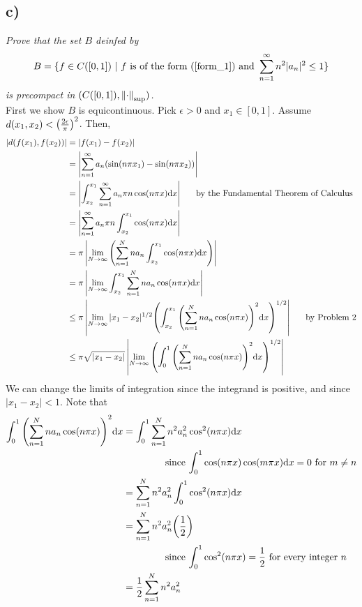 \documentclass[12pt]{article}
\begin{document}
\subsection*{ c)}
\emph{Prove that the set $B$ deinfed by}
\begin{equation*}
	B = \{f \in C([0,1])\ |\ f \text{ is of the form (\ref{form_1}) and } \sum_{n=1}^\infty n^2|a_n|^2 \leq 1\}
\end{equation*}
\emph{is precompact in $(C([0,1]), \norm{\cdot}_{\text{sup}})$.}\\

First we show $B$ is equicontinuous.  Pick $\epsilon >0$ and $x_1 \in [0,1]$.  Assume $d(x_1, x_2) < \qty(\frac{2\epsilon}{\pi})^2$.  Then,
\begin{align*}
	|d(f(x_1), f(x_2))| &= |f(x_1) - f(x_2)| \\
	&= \left|\sum_{n=1}^\infty a_n\qty(\sin(n\pi x_1) - \sin(n\pi x_2))\right| \\
	&= \left|\int_{x_2}^{x_1}\sum_{n=1}^\infty a_n \pi n \cos(n\pi x) \dd x\right| \ \ \ \ \ \text{by the Fundamental Theorem of Calculus} \\
	&= \left|\sum_{n=1}^\infty a_n\pi n \int_{x_2}^{x_1} \cos(n\pi x) \dd x\right| \\
	&= \pi \left|\lim_{N\rightarrow\infty}\qty(\sum_{n=1}^N n a_n \int_{x_2}^{x_1} \cos(n\pi x)\dd x)\right| \\
	&= \pi \left|\lim_{N\rightarrow\infty} \int_{x_2}^{x_1}\sum_{n=1}^N n a_n \cos(n\pi x) \dd x\right| \\
	&\leq \pi\left|\lim_{N\rightarrow\infty} |x_1 - x_2|^{1/2}\qty(\int_{x_2}^{x_1} \qty(\sum_{n=1}^N n a_n \cos(n\pi x))^2 \dd x)^{1/2}\right| \ \ \ \ \ \text{by Problem 2} \\
	&\leq \pi\sqrt{|x_1 - x_2|}\left|\lim_{N\rightarrow\infty} \qty(\int_0^1 \qty(\sum_{n=1}^N n a_n \cos(n\pi x))^2 \dd x)^{1/2}\right|
\end{align*}
We can change the limits of integration since the integrand is positive, and since $|x_1 - x_2| < 1$.  Note that
\begin{align*}
	\int_0^1\qty(\sum_{n=1}^N n a_n \cos(n\pi x))^2 \dd x &= \int_0^1\sum_{n=1}^N n^2 a_n^2 \cos^2(n\pi x) \dd x \\
	&\hphantom{mmmmm}\text{since $\displaystyle\int_0^1 \cos(n\pi x)\cos(m \pi x) \dd x = 0$ for $m \neq n$} \\
	&= \sum_{n=1}^N n^2 a_n^2 \int_0^1 \cos^2(n\pi x) \dd x \\
	&= \sum_{n=1}^N n^2 a_n^2 \qty(\frac{1}{2})\\
	&\hphantom{mmmmm}\text{since $\displaystyle\int_0^1 \cos^2(n\pi x) = \frac{1}{2}$ for every integer $n$} \\
	&= \frac{1}{2} \sum_{n=1}^N n^2 a_n^2
\end{align*}
\end{document}
